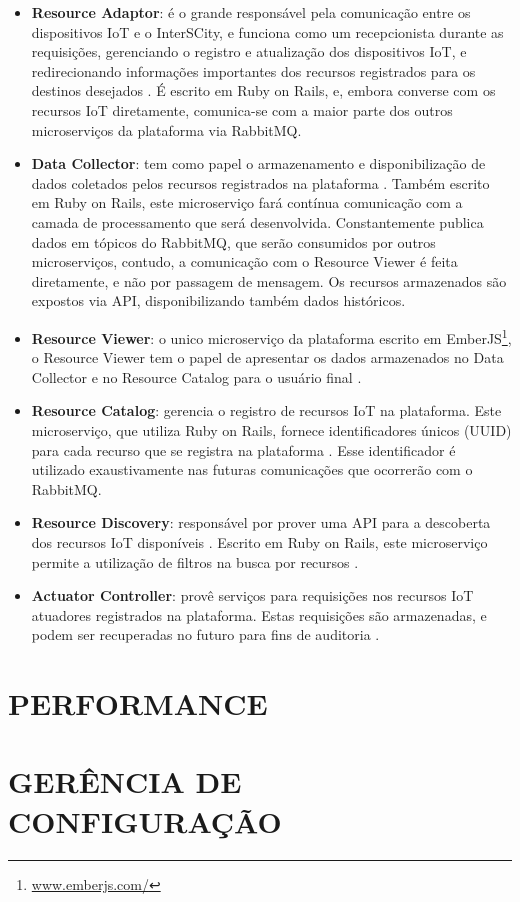 \begin{itemize}
    \item \textbf{Resource Adaptor}: é o grande responsável pela comunicação
entre os dispositivos IoT e o InterSCity, e funciona como um recepcionista
durante as requisições, gerenciando o registro e atualização dos
dispositivos IoT, e redirecionando informações importantes dos recursos
registrados para os destinos desejados \cite{delesposte2017}. É escrito em
Ruby on Rails, e, embora converse com os recursos IoT diretamente, comunica-se
com a maior parte dos outros microserviços da plataforma via RabbitMQ.

    \item \textbf{Data Collector}: tem como papel o armazenamento e
disponibilização de dados coletados pelos recursos registrados na plataforma
\cite{delesposte2017}. Também escrito em Ruby on Rails, este microserviço fará
contínua comunicação com a camada de processamento que será desenvolvida.
Constantemente publica dados em tópicos do RabbitMQ, que serão consumidos por
outros microserviços, contudo, a comunicação com o Resource Viewer é feita
diretamente, e não por passagem de mensagem. Os recursos armazenados são
expostos via API, disponibilizando também dados históricos.

    \item \textbf{Resource Viewer}: o unico microserviço da plataforma escrito em
EmberJS\footnote{\url{www.emberjs.com/}}, o Resource Viewer tem o papel de
apresentar os dados armazenados no Data Collector e no Resource Catalog para o
usuário final \cite{delesposte2017}.

    \item \textbf{Resource Catalog}: gerencia o registro de recursos IoT
na plataforma. Este microserviço, que utiliza Ruby on Rails, fornece
identificadores únicos (UUID) para cada recurso que se registra na plataforma
\cite{delesposte2017}.
Esse identificador é utilizado exaustivamente nas futuras comunicações que
ocorrerão com o RabbitMQ.

    \item \textbf{Resource Discovery}: responsável por prover uma API para a
descoberta dos recursos IoT disponíveis \cite{delesposte2017}. Escrito em Ruby
on Rails, este microserviço permite a utilização de filtros na busca por
recursos \cite{delesposte2017}.

    \item \textbf{Actuator Controller}: provê serviços para requisições nos
recursos IoT atuadores registrados na plataforma\cite{delesposte2017}. Estas
requisições são armazenadas, e podem ser recuperadas no futuro para fins
de auditoria \cite{delesposte2017}.

\end{itemize}

\section{PERFORMANCE}


\section{GERÊNCIA DE CONFIGURAÇÃO}

